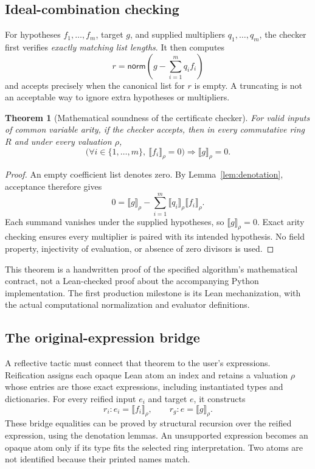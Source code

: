 \documentclass[11pt,letterpaper]{article}
\newtheorem{theorem}{Theorem}[section]
\theoremstyle{definition}\newtheorem{definition}[theorem]{Definition}
\newcommand{\sem}[1]{\llbracket #1\rrbracket}
\newcommand{\code}[1]{\texttt{\detokenize{#1}}}
\begin{document}
\subsection{Ideal-combination checking}
For hypotheses $f_1,\ldots,f_m$, target $g$, and supplied multipliers $q_1,\ldots,q_m$, the checker first verifies \emph{exactly matching list lengths}. It then computes
\[
 r=\mathsf{norm}\left(g-\sum_{i=1}^m q_i f_i\right)
\]
and accepts precisely when the canonical list for $r$ is empty. A truncating \code{zip} is not an acceptable way to ignore extra hypotheses or multipliers.

\begin{theorem}[Mathematical soundness of the certificate checker]\label{thm:checker}
For valid inputs of common variable arity, if the checker accepts, then in every commutative ring $R$ and under every valuation $\rho$,
\[
 \bigl(\forall i\in\{1,\ldots,m\},\ \sem{f_i}_\rho=0\bigr)
       \Longrightarrow \sem g_\rho=0.
\]
\end{theorem}
\begin{proof}
An empty coefficient list denotes zero. By Lemma~\ref{lem:denotation}, acceptance therefore gives
\[
 0=\sem g_\rho-\sum_{i=1}^m\sem{q_i}_\rho\sem{f_i}_\rho.
\]
Each summand vanishes under the supplied hypotheses, so $\sem g_\rho=0$. Exact arity checking ensures every multiplier is paired with its intended hypothesis. No field property, injectivity of evaluation, or absence of zero divisors is used.
\end{proof}
This theorem is a handwritten proof of the specified algorithm's mathematical contract, not a Lean-checked proof about the accompanying Python implementation. The first production milestone is its Lean mechanization, with the actual computational normalization and evaluator definitions.

\subsection{The original-expression bridge}
A reflective tactic must connect that theorem to the user's expressions. Reification assigns each opaque Lean atom an index and retains a valuation $\rho$ whose entries are those exact expressions, including instantiated types and dictionaries. For every reified input $e_i$ and target $e$, it constructs
\[
 r_i:e_i=\sem{f_i}_\rho,\qquad r_g:e=\sem g_\rho.
\]
These bridge equalities can be proved by structural recursion over the reified expression, using the denotation lemmas. An unsupported expression becomes an opaque atom only if its type fits the selected ring interpretation. Two atoms are not identified because their printed names match.
\end{document}
